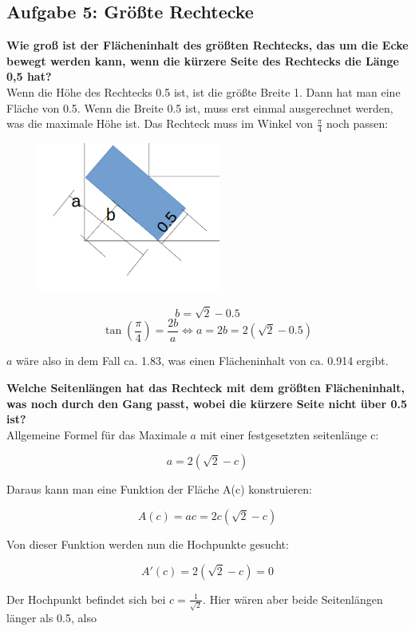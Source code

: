\documentclass[a4paper,11pt]{article}
\begin{document}
\subsection{Aufgabe 5: Gr\"o\ss te Rechtecke}

\textbf{Wie groß ist der Flächeninhalt des größten Rechtecks, das um die Ecke bewegt werden kann,
wenn die kürzere Seite des Rechtecks die Länge 0,5 hat?} \\
Wenn die H\"ohe des Rechtecks 0.5 ist, ist die gr\"o\ss te Breite 1. Dann hat man eine Fl\"ache von 0.5.
Wenn die Breite 0.5 ist, muss erst einmal ausgerechnet werden, was die maximale H\"ohe ist. Das Rechteck muss im Winkel von $\frac{\pi}{4}$ noch passen: 

\begin{figure}[htbp] 
        \centering
        \includegraphics[width=6cm]{img/A5_1.png}
\end{figure}

\[ b = \sqrt{2} - 0.5 \]
\[ \tan(\frac{\pi}{4}) = \frac{2b}{a} \Leftrightarrow  a = 2b  = 2(\sqrt{2}-0.5)  \]

$a$ w\"are also in dem Fall ca. 1.83, was einen Fl\"acheninhalt von ca. 0.914 ergibt.

\textbf{Welche Seitenl\"angen hat das Rechteck mit dem gr\"o\ss ten Fl\"acheninhalt, was noch durch den Gang passt, wobei die k\"urzere Seite nicht \"uber 0.5 ist?} \\
Allgemeine Formel f\"ur das Maximale $a$ mit einer festgesetzten seitenl\"ange c:

\[ a = 2(\sqrt{2}-c) \]

Daraus kann man eine Funktion der Fl\"ache A(c) konstruieren:

\[ A(c) = a c = 2c(\sqrt{2}-c) \]

Von dieser Funktion werden nun die Hochpunkte gesucht:

\[ A'(c) = 2(\sqrt{2}-c) = 0 \]

Der Hochpunkt befindet sich bei $c = \frac{1}{\sqrt{2}}$. Hier w\"aren aber beide Seitenl\"angen l\"anger als 0.5, also 
\end{document}
